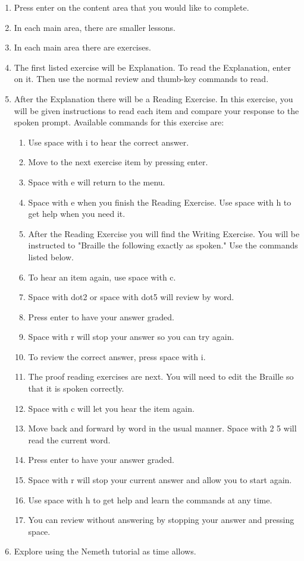 \documentclass[10pt,letterpaper,twoside]{report}
\begin{document}
{{{\begin{enumerate}
	\item Press enter on the content area that you would like to complete.
	\item In each main area, there are smaller lessons.
	\item In each main area there are exercises.
	\item The first listed exercise will be Explanation.  To read the Explanation, enter on it.  Then use the normal review and thumb-key commands to read.
	\item After the Explanation there will be a Reading Exercise.  In this exercise, you will be given instructions to read each item and compare your response to the spoken prompt.  Available commands for this exercise are:
	      \begin{enumerate}
		      \item Use space with i to hear the correct answer.
		      \item Move to the next exercise item by pressing enter.
		      \item Space with e will return to the menu.
		      \item Space with e when you finish the Reading Exercise.  Use space with h to get help when you need it.
		      \item After the Reading Exercise you will find the Writing Exercise.  You will be instructed to "Braille the following exactly as spoken." Use the commands listed below.
		      \item To hear an item again, use space with c.
		      \item Space with dot2 or space with dot5 will review by word.
		      \item Press enter to have your answer graded.
		      \item Space with r will stop your answer so you can try again.
		      \item To review the correct answer, press space with i.
		      \item The proof reading exercises are next.  You will need to edit the Braille so that it is spoken correctly.
		      \item Space with c will let you hear the item again.
		      \item Move back and forward by word in the usual manner.  Space with 2 5 will read the current word.
		      \item Press enter to have your answer graded.
		      \item Space with r will stop your current answer and allow you to start again.
		      \item Use space with h to get help and learn the commands at any time.
		      \item You can review without answering by stopping your answer and pressing space.
	      \end{enumerate}
	\item Explore using the Nemeth tutorial as time allows.
\end{enumerate}
\clearpage
}}}
\end{document}
